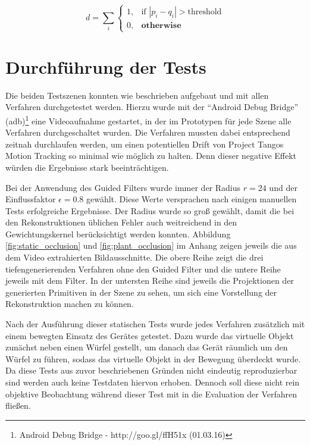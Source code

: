 \begin{equation} \label{eq:diff}
d = \sum_i 
	\begin{cases}
		1, & \text{if } | p_i - q_i | > \text{threshold} \\
		0, & \textbf{otherwise}
	\end{cases}
\end{equation}

\section{Durchführung der Tests}

Die beiden Testszenen konnten wie beschrieben aufgebaut und mit allen Verfahren durchgetestet werden. Hierzu wurde mit der \enquote{Android Debug Bridge} (adb)\footnote{Android Debug Bridge - http://goo.gl/ffH51x (01.03.16)} eine Videoaufnahme gestartet, in der im Prototypen für jede Szene alle Verfahren durchgeschaltet wurden. Die Verfahren mussten dabei entsprechend zeitnah durchlaufen werden, um einen potentiellen Drift von Project Tangos Motion Tracking so minimal wie möglich zu halten. Denn dieser negative Effekt würden die Ergebnisse stark beeinträchtigen. 

Bei der Anwendung des Guided Filters wurde immer der Radius \(r = 24\) und der Einflussfaktor \(\epsilon = 0.8\) gewählt. Diese Werte versprachen nach einigen manuellen Tests erfolgreiche Ergebnisse. Der Radius wurde so groß gewählt, damit die bei den Rekonstruktionen üblichen Fehler auch weitreichend in den Gewichtungskernel berücksichtigt werden konnten. Abbildung \ref{fig:static_occlusion} und \ref{fig:plant_occlusion} im Anhang zeigen jeweils die aus dem Video extrahierten Bildausschnitte. Die obere Reihe zeigt die drei tiefengenerierenden Verfahren ohne den Guided Filter und die untere Reihe jeweils mit dem Filter. In der untersten Reihe sind jeweils die Projektionen der generierten Primitiven in der Szene zu sehen, um sich eine Vorstellung der Rekonstruktion machen zu können.

Nach der Ausführung dieser statischen Tests wurde jedes Verfahren zusätzlich mit einem bewegten Einsatz des Gerätes getestet. Dazu wurde das virtuelle Objekt zunächst neben einen Würfel gestellt, um danach das Gerät räumlich um den Würfel zu führen, sodass das virtuelle Objekt in der Bewegung überdeckt wurde. Da diese Tests aus zuvor beschriebenen Gründen nicht eindeutig reproduzierbar sind werden auch keine Testdaten hiervon erhoben. Dennoch soll diese nicht rein objektive Beobachtung während dieser Test mit in die Evaluation der Verfahren fließen.

